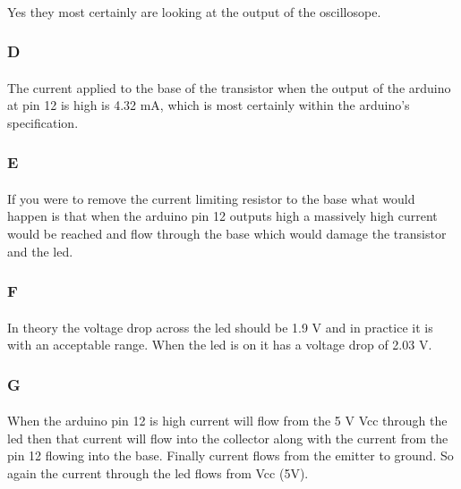 \documentclass[12pt]{article}
\begin{document}
				\paragraph{}
					Yes they most certainly are looking at the output of the oscillosope.

			\subsubsection{D}
				\paragraph{}
					The current applied to the base of the transistor when the output of the arduino at pin 12 is high is 4.32 mA, which is most 
					certainly within the arduino's specification.

			\subsubsection{E}
				\paragraph{}
					If you were to remove the current limiting resistor to the base what would happen is that when the arduino pin 12 outputs high a 
					massively high current would be reached and flow through the base which would damage the transistor and the led.

			\subsubsection{F}
				\paragraph{}
					In theory the voltage drop across the led should be 1.9 V and in practice it is with an acceptable range.  When the led is on it has a 
					voltage drop of 2.03 V.
			
			\subsubsection{G}
				\paragraph{}
					When the arduino pin 12 is high current will flow from the 5 V Vcc through the led then that current will flow into the collector along with 
					the current from the pin 12 flowing into the base.  Finally current flows from the emitter to ground.  So again the current through the led
					flows from Vcc (5V).
\end{document}
